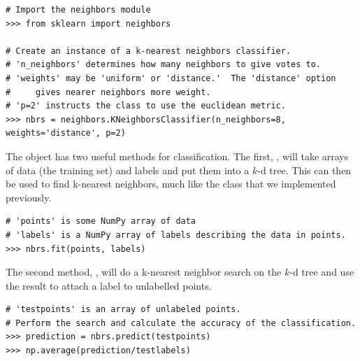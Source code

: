 \begin{lstlisting}
# Import the neighbors module
>>> from sklearn import neighbors

# Create an instance of a k-nearest neighbors classifier.
# 'n_neighbors' determines how many neighbors to give votes to.
# 'weights' may be 'uniform' or 'distance.'  The 'distance' option
#     gives nearer neighbors more weight.
# 'p=2' instructs the class to use the euclidean metric.
>>> nbrs = neighbors.KNeighborsClassifier(n_neighbors=8, weights='distance', p=2)
\end{lstlisting}

The  object has two useful methods for classification.
The first, , will take arrays of data (the training set) and labels and put them into a $k$-d tree.
This can then be used to find k-nearest neighbors, much like the  class that we implemented previously.

\begin{lstlisting}
# 'points' is some NumPy array of data
# 'labels' is a NumPy array of labels describing the data in points.
>>> nbrs.fit(points, labels)
\end{lstlisting}

The second method, , will do a k-nearest neighbor search on the $k$-d tree and use the result to attach a label to unlabelled points.

\begin{lstlisting}
# 'testpoints' is an array of unlabeled points.
# Perform the search and calculate the accuracy of the classification.
>>> prediction = nbrs.predict(testpoints)
>>> np.average(prediction/testlabels)
\end{lstlisting}

